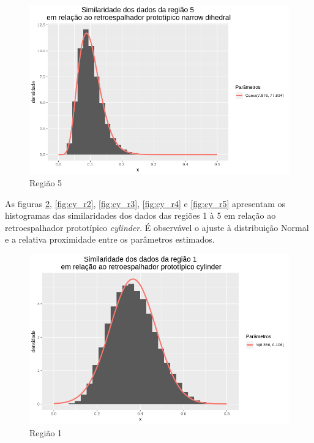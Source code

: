 \documentclass[12pt]{article}
\begin{document}
\begin{figure}[!h]
    \centering
    \includegraphics[width = \linewidth]{../../Images/Report_18_12_20/nd_region5.png}
    \caption{Região 5}
    \label{fig:nd_r5}
\end{figure}

As figuras \ref{fig:cy_r1}, \ref{fig:cy_r2}, \ref{fig:cy_r3}, \ref{fig:cy_r4} e \ref{fig:cy_r5} apresentam os histogramas das similaridades dos dados das regiões 1 à 5 em relação ao retroespalhador prototípico \textit{cylinder}. É observável o ajuste à distribuição Normal e a relativa proximidade entre os parâmetros estimados.

\begin{figure}[!h]
    \centering
    \vspace{0.05\linewidth}
    \includegraphics[width = \linewidth]{../../Images/Report_18_12_20/cy_region1.png}
    \caption{Região 1}
    \label{fig:cy_r1}
\end{figure}
\end{document}
